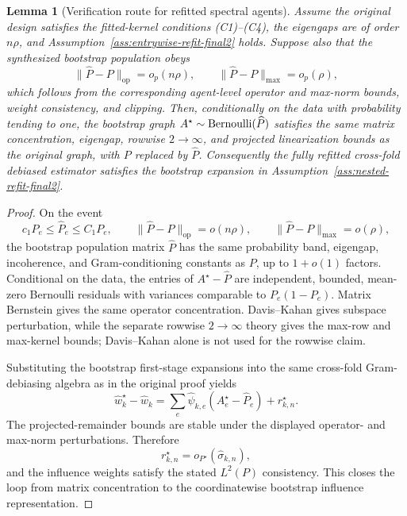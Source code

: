 \documentclass[12pt]{article}
\newtheorem{lemma}{Lemma}
\newcommand{\1}{\mathbf{1}}
\providecommand{\op}{\operatorname{op}}
\begin{document}
\begin{lemma}[Verification route for refitted spectral agents]
\label{lem:bootstrap-verification-final2}
Assume the original design satisfies the fitted-kernel conditions
(C1)--(C4), the eigengaps are of order \(n\rho\), and
Assumption~\ref{ass:entrywise-refit-final2} holds.  Suppose also that
the synthesized bootstrap population obeys
\[
  \|\widehat P-P\|_{\op}=o_p(n\rho),
  \qquad
  \|\widehat P-P\|_{\max}=o_p(\rho),
\]
which follows from the corresponding agent-level operator and max-norm
bounds, weight consistency, and clipping.  Then, conditionally on the
data with probability tending to one, the bootstrap graph
\(A^\star\sim{\rm Bernoulli}(\widehat P)\) satisfies the same matrix
concentration, eigengap, rowwise \(2\to\infty\), and projected
linearization bounds as the original graph, with \(P\) replaced by
\(\widehat P\).  Consequently the fully refitted cross-fold debiased
estimator satisfies the bootstrap expansion in
Assumption~\ref{ass:nested-refit-final2}.
\end{lemma}

\begin{proof}
On the event
\[
  c_1P_e\le\widehat P_e\le C_1P_e,\qquad
  \|\widehat P-P\|_{\op}=o(n\rho),\qquad
  \|\widehat P-P\|_{\max}=o(\rho),
\]
the bootstrap population matrix \(\widehat P\) has the same probability
band, eigengap, incoherence, and Gram-conditioning constants as \(P\), up
to \(1+o(1)\) factors.  Conditional on the data, the entries of
\(A^\star-\widehat P\) are independent, bounded, mean-zero Bernoulli
residuals with variances comparable to \(P_e(1-P_e)\).  Matrix
Bernstein gives the same operator concentration.  Davis--Kahan gives
subspace perturbation, while the separate rowwise \(2\to\infty\) theory
gives the max-row and max-kernel bounds; Davis--Kahan alone is not used
for the rowwise claim.

Substituting the bootstrap first-stage expansions into the same
cross-fold Gram-debiasing algebra as in the original proof yields
\[
  \widehat w_k^\star-\widehat w_k
  =
  \sum_e\widehat\psi_{k,e}(A_e^\star-\widehat P_e)
  +
  r_{k,n}^\star .
\]
The projected-remainder bounds are stable under the displayed
operator- and max-norm perturbations.  Therefore
\[
  r_{k,n}^\star=o_{P^\star}(\widehat\sigma_{k,n}),
\]
and the influence weights satisfy the stated \(L^2(P)\) consistency.
This closes the loop from matrix concentration to the
coordinatewise bootstrap influence representation.
\end{proof}
\end{document}
